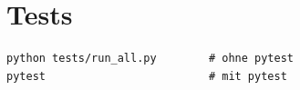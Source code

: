 \section{Tests}

\begin{lstlisting}[style=ps]
python tests/run_all.py        # ohne pytest
pytest                         # mit pytest
\end{lstlisting}
